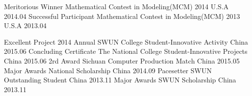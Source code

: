 \begin{cvhonors}
  \cvhonor
    {Meritorious Winner}
    {Mathematical Contest in Modeling(MCM) 2014}
    {U.S.A}
    {2014.04}
  \cvhonor
    {Successful Participant}
    {Mathematical Contest in Modeling(MCM) 2013}
    {U.S.A}
    {2013.04}
\end{cvhonors}

\begin{cvhonors}
  \cvhonor
    {Excellent Project}
    {2014 Annual SWUN College Student-Innovative Activity}
    {China}
    {2015.06}
  \cvhonor
    {Concluding Certificate}
    {The National College Student-Innovative Projects}
    {China}
    {2015.06}
  \cvhonor
    {2rd Award}
    {Sichuan Computer Production Match}
    {China}
    {2015.05}
  \cvhonor
    {Major Awards}
    {National Scholarship}
    {China}
    {2014.09}
  \cvhonor
    {Pacesetter}
    {SWUN Outstanding Student}
    {China}
    {2013.11}
  \cvhonor
    {Major Awards}
    {SWUN Scholarship}
    {China}
    {2013.11}
\end{cvhonors}
